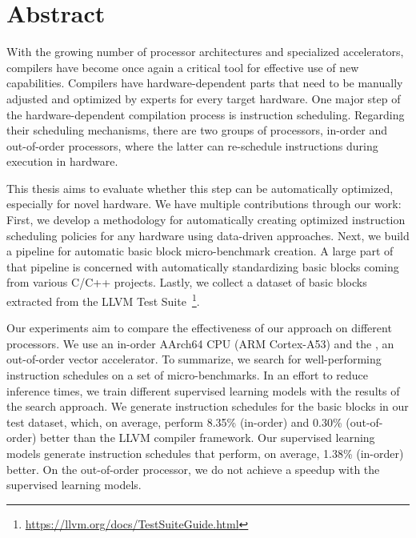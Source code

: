\chapter*{Abstract}
With the growing number of processor architectures and specialized accelerators, compilers have become once again a critical tool for effective use of new capabilities.
Compilers have hardware-dependent parts that need to be manually adjusted and optimized by experts for every target hardware.
One major step of the hardware-dependent compilation process is instruction scheduling.
Regarding their scheduling mechanisms, there are two groups of processors, in-order and out-of-order processors, where the latter can re-schedule instructions during execution in hardware.

This thesis aims to evaluate whether this step can be automatically optimized, especially for novel hardware.
We have multiple contributions through our work:
First, we develop a methodology for automatically creating optimized instruction scheduling policies for any hardware using data-driven approaches.
Next, we build a pipeline for automatic basic block micro-benchmark creation.
A large part of that pipeline is concerned with automatically standardizing basic blocks coming from various C/C++ projects.
Lastly, we collect a dataset of basic blocks extracted from the LLVM Test Suite~\footnote{\url{https://llvm.org/docs/TestSuiteGuide.html}}.

Our experiments aim to compare the effectiveness of our approach on different processors.
We use an in-order AArch64 CPU (ARM Cortex-A53) and the \auroralong{}, an out-of-order vector accelerator.
To summarize, we search for well-performing instruction schedules on a set of micro-benchmarks.
In an effort to reduce inference times, we train different supervised learning models with the results of the search approach.
We generate instruction schedules for the basic blocks in our test dataset, which, on average, perform 8.35\% (in-order) and 0.30\% (out-of-order) better than the LLVM compiler framework.
Our supervised learning models generate instruction schedules that perform, on average, 1.38\% (in-order) better.
On the out-of-order processor, we do not achieve a speedup with the supervised learning models.

